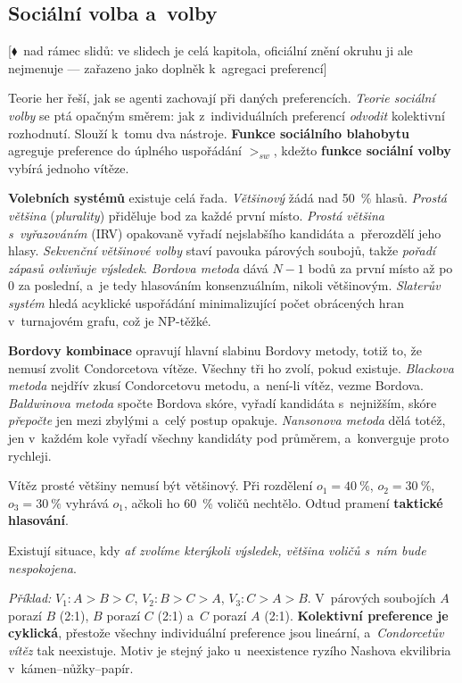 \documentclass[11pt,a4paper]{article}
\theoremstyle{definition}
\newcommand{\mimoq}[1]{\textcolor{markcol}{\textsf{\footnotesize[$\blacklozenge$~nad rámec slidů: #1]}}}
\begin{document}
\subsection{Sociální volba a~volby}
\label{ssec:volby}

\noindent\mimoq{ve slidech je celá kapitola, oficiální znění okruhu ji ale nejmenuje ---
zařazeno jako doplněk k~agregaci preferencí}

Teorie her řeší, jak se agenti zachovají při daných preferencích. \emph{Teorie sociální volby}
se ptá opačným směrem: jak z~individuálních preferencí \emph{odvodit} kolektivní rozhodnutí.
Slouží k~tomu dva nástroje. \textbf{Funkce sociálního blahobytu} agreguje preference do úplného
uspořádání $>_{sw}$, kdežto \textbf{funkce sociální volby} vybírá jednoho vítěze.

\textbf{Volebních systémů} existuje celá řada. \emph{Většinový} žádá nad 50~\% hlasů.
\emph{Prostá většina} (\emph{plurality}) přiděluje bod za každé první místo. \emph{Prostá
většina s~vyřazováním} (IRV) opakovaně vyřadí nejslabšího kandidáta a~přerozdělí jeho hlasy.
\emph{Sekvenční většinové volby} staví pavouka párových soubojů, takže \emph{pořadí zápasů
ovlivňuje výsledek}. \emph{Bordova metoda} dává $N-1$ bodů za první místo až po $0$ za poslední,
a~je tedy hlasováním konsenzuálním, nikoli většinovým. \emph{Slaterův systém} hledá acyklické
uspořádání minimalizující počet obrácených hran v~turnajovém grafu, což je NP-těžké.

\textbf{Bordovy kombinace} opravují hlavní slabinu Bordovy metody, totiž to, že nemusí zvolit
Condorcetova vítěze. Všechny tři ho zvolí, pokud existuje. \emph{Blackova metoda} nejdřív zkusí
Condorcetovu metodu, a~není-li vítěz, vezme Bordova. \emph{Baldwinova metoda} spočte Bordova
skóre, vyřadí kandidáta s~nejnižším, skóre \emph{přepočte} jen mezi zbylými a~celý postup
opakuje. \emph{Nansonova metoda} dělá totéž, jen v~každém kole vyřadí všechny kandidáty pod
průměrem, a~konverguje proto rychleji.

Vítěz prosté většiny nemusí být většinový. Při rozdělení $o_1 = 40~\%$, $o_2 = 30~\%$,
$o_3 = 30~\%$ vyhrává $o_1$, ačkoli ho 60~\% voličů nechtělo. Odtud pramení \textbf{taktické
hlasování}.

\begin{defbox}
Existují situace, kdy \emph{ať zvolíme kterýkoli výsledek, většina voličů s~ním bude
nespokojena}.

\emph{Příklad:} $V_1: A > B > C$, \quad $V_2: B > C > A$, \quad $V_3: C > A > B$.
V~párových soubojích $A$ porazí $B$ (2:1), $B$ porazí $C$ (2:1) a~$C$ porazí $A$ (2:1).
\textbf{Kolektivní preference je cyklická}, přestože všechny individuální preference jsou
lineární, a~\emph{Condorcetův vítěz} tak neexistuje. Motiv je stejný jako u~neexistence ryzího
Nashova ekvilibria v~kámen--nůžky--papír.
\end{defbox}
\end{document}
